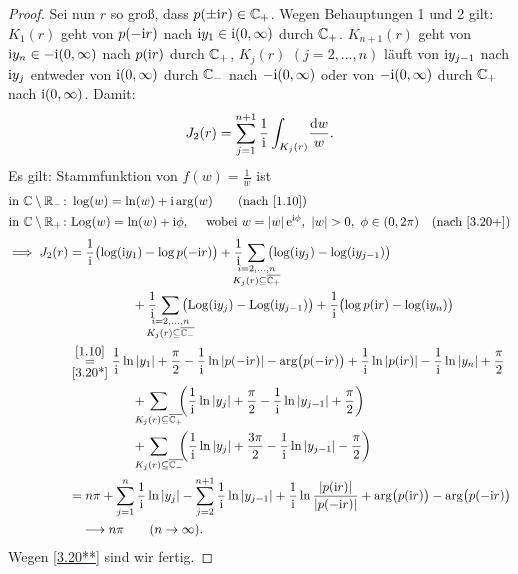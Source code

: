 \documentclass[a4paper,twoside,DIV15,BCOR12mm]{scrbook}
\begin{document}
\begin{proof}
Sei nun $r$ so groß, dass $p(\pm\mathrm{i} r)\in\mathbb{C}_+$. Wegen Behauptungen 1 und 2 gilt: $K_1(r)$ geht von $p(-\mathrm{i} r)$ nach $\mathrm{i} y_1\in\mathrm{i}(0,\infty)$ durch $\mathbb{C}_+$. $K_{n+1}(r)$ geht von $\mathrm{i} y_n\in-\mathrm{i}(0,\infty)$ nach $p(\mathrm{i} r)$ durch $\mathbb{C}_+$, $K_j(r)$ $(j=2,\dotsc,n)$ läuft von $\mathrm{i} y_{j-1}$ nach $\mathrm{i} y_j$ entweder von $\mathrm{i} (0,\infty)$ durch $\mathbb{C}_-$ nach $-\mathrm{i}(0,\infty)$ oder von $-\mathrm{i}(0,\infty)$ durch $\mathbb{C}_+$ nach $\mathrm{i}(0,\infty)$. Damit:
\[J_2(r) = \sum_{j=1}^{n+1}\frac{1}{\mathrm{i}}\int_{K_j(r)}\!\frac{\mathrm{d} w}{w}.\]
Es gilt: Stammfunktion von $f(w) = \frac{1}{w}$ ist
\begin{align*}
\text{in }\C\setminus\R_-\colon&\log(w) = \ln(w)+\i\arg(w)\qquad\text{(nach~\eqref{1.10})}\\
\text{in }\C\setminus\R_+\colon&\Log(w) = \ln(w)+\i\phi,\quad\text{ wobei }w = \abs{w}\e^{\i\phi},\ \abs{w}>0,\ \phi\in(0,2\pi)\quad\text{(nach \eqref{3.20+})}
\end{align*}
\begin{align*}
\folgt J_2(r) &= \frac{1}{\i}\bigl(\log(\i y_1)-\log p(-\i r)\bigr) + \frac{1}{\i}\!\!\!\!\!\!\sum_{\substack{i=2,\dotsc,n\\K_j(r)\subseteq\abg{\C_+}}}\!\!\!\!\!\!\bigl(\log(\i y_j)-\log(\i y_{j-1})\bigr)\\&\quad\qquad\qquad + \frac{1}{\i}\!\!\!\!\!\!\sum_{\substack{i=2,\dotsc,n\\K_j(r)\subseteq\abg{\C_-}}}\!\!\!\!\!\!\bigl(\Log(\i y_j)-\Log(\i y_{j-1})\bigr) + \frac{1}{\i}\bigl(\log p(\i r)-\log(\i y_{n})\bigr)\\
&\overset{\eqref{1.10}}{\underset{\eqref{3.20*}}{=}} \frac{1}{\i}\ln\abs{y_1}+\frac{\pi}{2} - \frac{1}{\i}\ln\abs{p(-\i r)} - \arg\bigl(p(-\i r)\bigr) + \frac{1}{\i}\ln\abs{p(\i r)}  - \frac{1}{\i}\ln\abs{y_n}+\frac{\pi}{2}\\
&\quad\qquad\qquad+\!\!\!\!\!\!\sum_{K_j(r)\subseteq\abg{\C_+}}\!\!\!\left(\frac{1}{\i}\ln\abs{y_j} + \frac{\pi}{2} - \frac{1}{\i}\ln\abs{y_{j-1}}+ \frac{\pi}{2}\right)\\
&\quad\qquad\qquad+\!\!\!\!\!\!\sum_{K_j(r)\subseteq\abg{\C_-}}\!\!\!\left(\frac{1}{\i}\ln\abs{y_j} + \frac{3\pi}{2} - \frac{1}{\i}\ln\abs{y_{j-1}}- \frac{\pi}{2}\right)\\
&=n\pi + \sum_{j=1}^n\frac{1}{\i}\ln\abs{y_j} - \sum_{j=2}^{n+1}\frac{1}{\i}\ln\abs{y_{j-1}} + \frac{1}{\i}\ln\frac{\abs{p(\i r)}}{\abs{p(-\i r)}} + \arg\bigl(p(\i r)\bigr) - \arg\bigl(p(-\i r)\bigr)\\
&\quad \lra n\pi\qquad(n\to\infty).
\end{align*}
Wegen \eqref{3.20**} sind wir fertig.


\end{proof}
\end{document}
